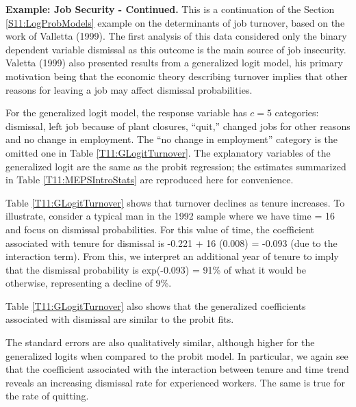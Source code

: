 \linejed

\textbf{Example: Job Security - Continued.} This is a continuation
of the Section \ref{S11:LogProbModels} example on the determinants
of job turnover, based on the work of Valletta (1999). The first
analysis of this data considered only the binary dependent variable
dismissal as this outcome is the main source of job insecurity.
Valetta (1999) also presented results from a generalized logit
model, his primary motivation being that the economic theory
describing turnover implies that other reasons for leaving a job may
affect dismissal probabilities.

For the generalized logit model, the response variable has $c = 5$
categories: dismissal, left job because of plant closures, ``quit,''
changed jobs for other reasons and no change in employment. The
``no change in employment'' category is the omitted one in Table
\ref{T11:GLogitTurnover}. The explanatory variables of the
generalized logit are the same as the probit regression; the
estimates summarized in Table \ref{T11:MEPSIntroStats} are
reproduced here for convenience.

Table \ref{T11:GLogitTurnover} shows that turnover declines as
tenure increases. To illustrate, consider a typical man in the 1992
sample where we have time = 16 and focus on dismissal probabilities.
For this value of time, the coefficient associated with tenure for
dismissal is -0.221 + 16   (0.008) = -0.093 (due to the interaction
term). From this, we interpret an additional year of tenure to imply
that the dismissal probability is exp(-0.093) = 91\% of what it
would be otherwise, representing a decline of 9\%.

Table \ref{T11:GLogitTurnover} also shows that the generalized
coefficients associated with dismissal are similar to the probit
fits.

The standard errors are also qualitatively similar, although higher
for the generalized logits when compared to the probit model. In
particular, we again see that the coefficient associated with the
interaction between tenure and time trend reveals an increasing
dismissal rate for experienced workers. The same is true for the
rate of quitting.

